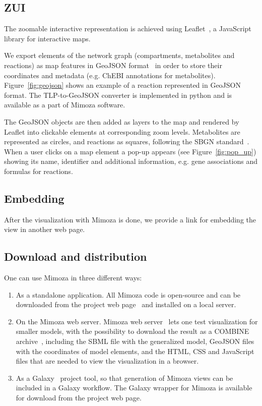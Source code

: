 \documentclass{bmcart}
\begin{document}
\subsection*{ZUI}

The zoomable interactive representation is achieved using Leaflet~\cite{Agafonkin}, a JavaScript library for interactive maps. 

We export elements of the network graph (compartments, metabolites and reactions) as map features in GeoJSON format~\cite{Butler} in order to store their coordinates and metadata (e.g. ChEBI annotations for metabolites). Figure~\ref{fig:geojson} shows an example of a reaction represented in GeoJSON format. The TLP-to-GeoJSON converter is implemented in python and is available as a part of Mimoza software. 

The GeoJSON objects are then added as layers to the map and rendered by Leaflet into clickable elements at corresponding zoom levels. Metabolites are represented as circles, and reactions as squares, following the SBGN standard~\cite{LeNovere2009}.  When a user clicks on a map element a pop-up appears (see Figure~\ref{fig:pop_up}) showing its name, identifier and additional information, e.g. gene associations and formulas for reactions. 
 

\subsection*{Embedding}
After the visualization with Mimoza is done, we provide a link for embedding the view in another web page.

\subsection*{Download and distribution}

One can use Mimoza in three different ways:
\begin{enumerate}
\item As a standalone application.
All Mimoza code is open-source and can be downloaded from the project web page~\cite{Zhukovaa} and installed on a local server.
\item On the Mimoza web server.
Mimoza web server~\cite{Zhukovaa} lets one test visualization for smaller models, with the possibility to download the result as a COMBINE archive~\cite{Bergmann2014}, including the SBML file with the generalized model, GeoJSON files with the coordinates of model elements, and the HTML, CSS and JavaScript files that are needed to view the visualization in a browser.
\item As a Galaxy~\cite{Blankenberg2010} project tool, so that generation of Mimoza views can be included in a Galaxy workflow.
The Galaxy wrapper for Mimoza is available for download from the project web page.
\end{enumerate}
\end{document}
